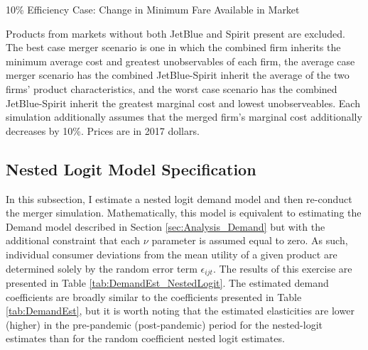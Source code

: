\documentclass{article}
\begin{document}
\begin{appendices}
   \begin{table}
        \caption{10\% Efficiency Case: Change in Minimum Fare Available in Market}
        \label{tab:MinimumPrice_10}
                \vspace{-15mm}
        \begin{center}
            
        \end{center}
        \vspace{-5mm}
        \footnotesize{Products from markets without both JetBlue and Spirit present are excluded. The best case merger scenario is one in which the combined firm inherits the minimum average cost and greatest unobservables of each firm, the average case merger scenario has the combined JetBlue-Spirit inherit the average of the two firms' product characteristics, and the worst case scenario has the combined JetBlue-Spirit inherit the greatest marginal cost and lowest unobserveables. Each simulation additionally assumes that the merged firm's marginal cost additionally decreases by 10\%. Prices are in 2017 dollars.}
    \end{table}  
    
\pagebreak
\FloatBarrier
    \subsection{Nested Logit Model Specification}
    In this subsection, I estimate a nested logit demand model and then re-conduct the merger simulation. Mathematically, this model is equivalent to estimating the Demand model described in Section \ref{sec:Analysis_Demand} but with the additional constraint that each $\nu$ parameter is assumed equal to zero. As such, individual consumer deviations from the mean utility of a given product are determined solely by the random error term $\epsilon_{ijt}$. The results of this exercise are presented in Table \ref{tab:DemandEst_NestedLogit}. The estimated demand coefficients are broadly similar to the coefficients presented in Table \ref{tab:DemandEst}, but it is worth noting that the estimated elasticities are lower (higher)  in the pre-pandemic (post-pandemic) period for the nested-logit estimates than for the random coefficient nested logit estimates. 


\end{appendices}
\end{document}
